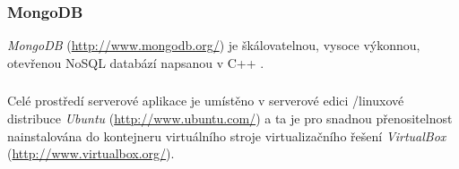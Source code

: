 \subsubsection{MongoDB}
\emph{MongoDB} (\url{http://www.mongodb.org/}) je škálovatelnou, vysoce výkonnou, otevřenou NoSQL databází napsanou v C++ \cite{Mongo}.

\subsubsection*{ }
Celé prostředí serverové aplikace je umístěno v serverové edici /linuxové distribuce \emph{Ubuntu} (\url{http://www.ubuntu.com/}) a ta je pro snadnou přenositelnost nainstalována do kontejneru virtuálního stroje virtualizačního řešení \emph{VirtualBox} (\url{http://www.virtualbox.org/}).

